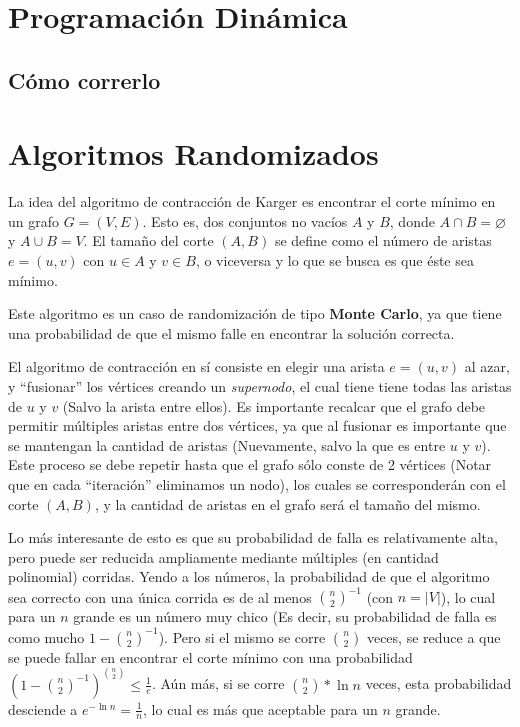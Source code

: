 \documentclass[a4paper,10pt]{article}
\begin{document}
\maketitle
\thispagestyle{empty}

\pagebreak 

\tableofcontents
\pagebreak

\clearpage
\section{Programación Dinámica}


\subsection{Cómo correrlo}


\section{Algoritmos Randomizados}
La idea del algoritmo de contracción de Karger es encontrar el corte mínimo en un grafo $G=(V,E)$. Esto es, dos conjuntos no vacíos $A$ y $B$, donde $A \cap B = \varnothing$ y $A \cup B = V$. El tamaño del corte $(A,B)$ se define como el número de aristas $e = (u,v)$ con $u \in A$ y $v \in B$, o viceversa y lo que se busca es que éste sea mínimo.

Este algoritmo es un caso de randomización de tipo \textbf{Monte Carlo}, ya que tiene una probabilidad de que el mismo falle en encontrar la solución correcta.

El algoritmo de contracción en sí consiste en elegir una arista $e=(u,v)$ al azar, y “fusionar” los vértices creando un \textit{supernodo}, el cual tiene tiene todas las aristas de $u$ y $v$ (Salvo la arista entre ellos). Es importante recalcar que el grafo debe permitir múltiples aristas entre dos vértices, ya que al fusionar es importante que se mantengan la cantidad de aristas (Nuevamente, salvo la que es entre $u$ y $v$). Este proceso se debe repetir hasta que el grafo sólo conste de 2 vértices (Notar que en cada ``iteración'' eliminamos un nodo), los cuales se corresponderán con el corte $(A,B)$, y la cantidad de aristas en el grafo será el tamaño del mismo.

Lo más interesante de esto es que su probabilidad de falla es relativamente alta, pero puede ser reducida ampliamente mediante múltiples (en cantidad polinomial) corridas. Yendo a los números, la probabilidad de que el algoritmo sea correcto con una única corrida es de al menos ${\binom{n}{2}}^{-1}$ (con $n = |V|$), lo cual para un $n$ grande es un número muy chico (Es decir, su probabilidad de falla es como mucho $1 - {\binom{n}{2}}^{-1}$). Pero si el mismo se corre $\binom{n}{2}$ veces, se reduce a que se puede fallar en encontrar el corte mínimo con una probabilidad $(1 - {\binom{n}{2}}^{-1})^{\binom{n}{2}} \leq \frac{1}{e}$. Aún más, si se corre $\binom{n}{2}*\ln n$ veces, esta probabilidad desciende a $e^{-\ln n} = \frac{1}{n}$, lo cual es más que aceptable para un $n$ grande.
\end{document}
